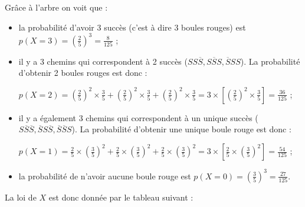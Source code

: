 {\begin{center}
\begin{extern}
{
}
\end{extern}
\end{center}
     Grâce à l'arbre on voit que :
     \begin{itemize}
          \item la probabilité d'avoir 3 succès (c'est à dire 3 boules rouges) est $p\left(X=3\right) =\left(\frac{2}{5}\right)^{3}=\frac{8}{125}$ ;
          \item il y a 3 chemins qui correspondent à 2 succès ($SS\overline S, S\overline SS, \overline SSS$). La probabilité d'obtenir 2 boules rouges est donc :
          \par
          $p\left(X=2\right) =\left(\frac{2}{5}\right)^{2}\times \frac{3}{5}+\left(\frac{2}{5}\right)^{2}\times \frac{3}{5}+\left(\frac{2}{5}\right)^{2}\times \frac{3}{5}$\nosp$=3\times \left[\left(\frac{2}{5}\right)^{2}\times \frac{3}{5}\right]=\frac{36}{125}$ ;
          \item il y a également 3 chemins qui correspondent à un unique succès ($S\overline S\overline S, \overline SS\overline S, \overline S\overline SS$). La probabilité d'obtenir une unique boule rouge est donc :
          \par
          $p\left(X=1\right) = \frac{2}{5}\times \left(\frac{3}{5}\right)^{2}+ \frac{2}{5}\times \left(\frac{3}{5}\right)^{2}+ \frac{2}{5}\times \left(\frac{3}{5}\right)^{2}$\nosp$=3\times \left[ \frac{2}{5}\times \left(\frac{3}{5}\right)^{2}\right]=\frac{54}{125}$ ;
          \item la probabilité de n'avoir aucune boule rouge est $p\left(X=0\right) =\left(\frac{3}{5}\right)^{3}=\frac{27}{125}$.
     \end{itemize}
     La loi de $X$ est donc donnée par le tableau suivant :
}
